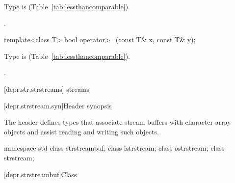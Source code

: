 \begin{itemdescr}
\pnum
\requires
Type  is  (Table~\ref{tab:lessthancomparable}).

\pnum
\returns
{}.
\end{itemdescr}

%
\begin{itemdecl}
template<class T> bool operator>=(const T& x, const T& y);
\end{itemdecl}

\begin{itemdescr}
\pnum
\requires
Type  is  (Table~\ref{tab:lessthancomparable}).

\pnum
\returns
{}.
\end{itemdescr}

[depr.str.strstreams]{ streams}

[depr.strstream.syn]{Header  synopsis}

\pnum
The header
%
defines types that associate stream buffers with
character array objects and assist reading and writing such objects.

\begin{codeblock}
namespace std {
  class strstreambuf;
  class istrstream;
  class ostrstream;
  class strstream;
}
\end{codeblock}

[depr.strstreambuf]{Class }


